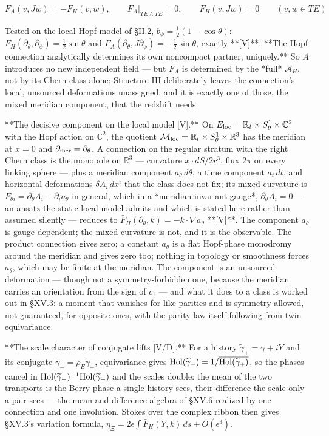 $$F_A(v,Jw) = -F_H(v,w),\qquad F_A\big|_{TE\wedge TE} = 0,\qquad F_H(v,Jw) = 0\qquad(v,w\in TE)$$

Tested on the local Hopf model of §II.2, $b_\phi = \tfrac12(1-\cos\theta)$: $F_H(\partial_\theta,\partial_\phi) = \tfrac12\sin\theta$ and $F_A(\partial_\theta,J\partial_\phi) = -\tfrac12\sin\theta$, exactly **[V]**. **The Hopf connection analytically determines its own noncompact partner, uniquely.** So $A$ introduces no new independent field — but $F_A$ is determined by the *full* $\mathcal A_H$, not by its Chern class alone: Structure III deliberately leaves the connection's local, unsourced deformations unassigned, and it is exactly one of those, the mixed meridian component, that the redshift needs.

**The decisive component on the local model [V].** On $E_{\rm loc} = \mathbb R_t\times S^1_\theta\times\mathbb C^2$ with the Hopf action on $\mathbb C^2$, the quotient $\mathcal M_{\rm loc} = \mathbb R_t\times S^1_\theta\times\mathbb R^3$ has the meridian at $x = 0$ and $\partial_{\rm mer} = \partial_\theta$. A connection on the regular stratum with the right Chern class is the monopole on $\mathbb R^3$ — curvature $x\cdot dS/2r^3$, flux $2\pi$ on every linking sphere — plus a meridian component $a_\theta\,d\theta$, a time component $a_t\,dt$, and horizontal deformations $\delta A_i\,dx^i$ that the class does not fix; its mixed curvature is $F_{\theta i} = \partial_\theta A_i-\partial_ia_\theta$ in general, which in a *meridian-invariant gauge*, $\partial_\theta A_i = 0$ — an ansatz the static local model admits and which is stated here rather than assumed silently — reduces to $\bar F_H(\partial_\theta,k) = -k\cdot\nabla a_\theta$ **[V]**. The component $a_\theta$ is gauge-dependent; the mixed curvature is not, and it is the observable. The product connection gives zero; a constant $a_\theta$ is a flat Hopf-phase monodromy around the meridian and gives zero too; nothing in topology or smoothness forces $a_\theta$, which may be finite at the meridian. The component is an unsourced deformation — though not a symmetry-forbidden one, because the meridian carries an orientation from the sign of $c_1$ — and what it does to a class is worked out in §XV.3: a moment that vanishes for like parities and is symmetry-allowed, not guaranteed, for opposite ones, with the parity law itself following from twin equivariance.

**The scale character of conjugate lifts [V/D].** For a history $\widetilde\gamma_+ = \gamma+iY$ and its conjugate $\widetilde\gamma_- = \rho_E\widetilde\gamma_+$, equivariance gives ${\rm Hol}(\widetilde\gamma_-) = 1/\overline{ {\rm Hol}(\widetilde\gamma_+)}$, so the phases cancel in ${\rm Hol}(\widetilde\gamma_-)^{-1}{\rm Hol}(\widetilde\gamma_+)$ and the scales double: the mean of the two transports is the Berry phase a single history sees, their difference the scale only a pair sees — the mean-and-difference algebra of §XV.6 realized by one connection and one involution. Stokes over the complex ribbon then gives §XV.3's variation formula, $\eta_\Xi = 2\epsilon\int\bar F_H(Y,k)\,ds+O(\epsilon^3)$.

